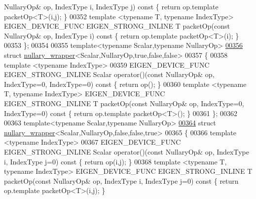 \begin{DoxyCode}
      NullaryOp& op, IndexType i, IndexType j)\textcolor{keyword}{ const }\{ \textcolor{keywordflow}{return} op.template packetOp<T>(i,j); \}
00352   \textcolor{keyword}{template} <\textcolor{keyword}{typename} T, \textcolor{keyword}{typename} IndexType> EIGEN\_DEVICE\_FUNC EIGEN\_STRONG\_INLINE T packetOp(\textcolor{keyword}{const} 
      NullaryOp& op, IndexType i)\textcolor{keyword}{ const }\{ \textcolor{keywordflow}{return} op.template packetOp<T>(i); \}
00353 \};
00354 
00355 \textcolor{keyword}{template}<\textcolor{keyword}{typename} Scalar,\textcolor{keyword}{typename} NullaryOp>
\hyperlink{struct_eigen_1_1internal_1_1nullary__wrapper_3_01_scalar_00_01_nullary_op_00_01true_00_01false_00_01false_01_4}{00356} \textcolor{keyword}{struct }\hyperlink{struct_eigen_1_1internal_1_1nullary__wrapper}{nullary\_wrapper}<Scalar,NullaryOp,true,false,false>
00357 \{
00358   \textcolor{keyword}{template} <\textcolor{keyword}{typename} IndexType>
00359   EIGEN\_DEVICE\_FUNC EIGEN\_STRONG\_INLINE Scalar operator()(\textcolor{keyword}{const} NullaryOp& op, IndexType=0, IndexType=0)\textcolor{keyword}{
       const }\{ \textcolor{keywordflow}{return} op(); \}
00360   \textcolor{keyword}{template} <\textcolor{keyword}{typename} T, \textcolor{keyword}{typename} IndexType> EIGEN\_DEVICE\_FUNC EIGEN\_STRONG\_INLINE T packetOp(\textcolor{keyword}{const} 
      NullaryOp& op, IndexType=0, IndexType=0)\textcolor{keyword}{ const }\{ \textcolor{keywordflow}{return} op.template packetOp<T>(); \}
00361 \};
00362 
00363 \textcolor{keyword}{template}<\textcolor{keyword}{typename} Scalar,\textcolor{keyword}{typename} NullaryOp>
\hyperlink{struct_eigen_1_1internal_1_1nullary__wrapper_3_01_scalar_00_01_nullary_op_00_01false_00_01false_00_01true_01_4}{00364} \textcolor{keyword}{struct }\hyperlink{struct_eigen_1_1internal_1_1nullary__wrapper}{nullary\_wrapper}<Scalar,NullaryOp,false,false,true>
00365 \{
00366   \textcolor{keyword}{template} <\textcolor{keyword}{typename} IndexType>
00367   EIGEN\_DEVICE\_FUNC EIGEN\_STRONG\_INLINE Scalar operator()(\textcolor{keyword}{const} NullaryOp& op, IndexType i, IndexType j=0)\textcolor{keyword}{
       const }\{ \textcolor{keywordflow}{return} op(i,j); \}
00368   \textcolor{keyword}{template} <\textcolor{keyword}{typename} T, \textcolor{keyword}{typename} IndexType> EIGEN\_DEVICE\_FUNC EIGEN\_STRONG\_INLINE T packetOp(\textcolor{keyword}{const} 
      NullaryOp& op, IndexType i, IndexType j=0)\textcolor{keyword}{ const }\{ \textcolor{keywordflow}{return} op.template packetOp<T>(i,j); \}

\end{DoxyCode}
